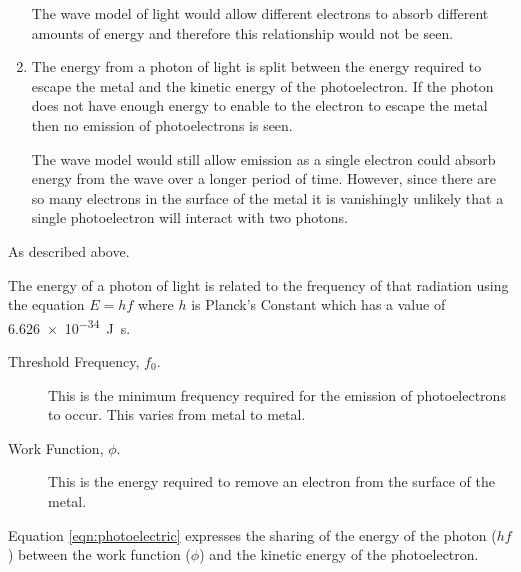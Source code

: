 \documentclass[revision-guide.tex]{subfiles}
\begin{document}
\begin{enumerate}[label=\emph{(\alph*)}]
The wave model of light would allow different electrons to absorb different amounts of energy and therefore this relationship would not be seen.

\item The energy from a photon of light is split between the energy required to escape the metal and the kinetic energy of the photoelectron. If the photon does not have enough energy to enable to the electron to escape the metal then no emission of photoelectrons is seen.

The wave model would still allow emission as a single electron could absorb energy from the wave over a longer period of time. However, since there are so many electrons in the surface of the metal it is vanishingly unlikely that a single photoelectron will interact with two photons.

\end{enumerate}


As described above.


The energy of a photon of light is related to the frequency of that radiation using the equation $E=hf$ where $h$ is Planck's Constant which has a value of \SI{6.626e-34}{\joule\second}.


\begin{description}
  \item[Threshold Frequency, $f_0$.] This is the minimum frequency required for the emission of photoelectrons to occur. This varies from metal to metal.
  \item[Work Function, $\phi$.] This is the energy required to remove an electron from the surface of the metal.
\end{description}

Equation \ref{eqn:photoelectric} expresses the sharing of the energy of the photon ($hf$) between the work function ($\phi$) and the kinetic energy of the photoelectron.

\end{document}
